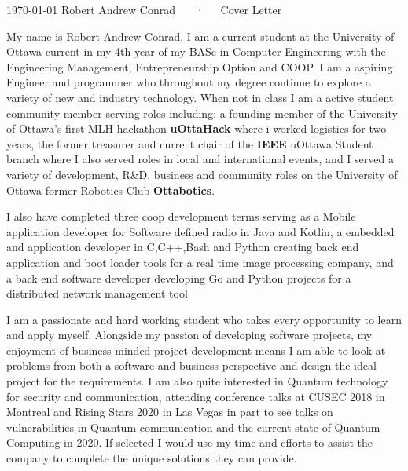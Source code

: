 \documentclass[11pt, a4paper]{awesome-cv}
\begin{document}
\makecvheader[R]

\makecvfooter
  {\today}
  {Robert Andrew Conrad ~~~·~~~Cover Letter}
  {}

\makelettertitle

\begin{cvletter}


My name is Robert Andrew Conrad, I am a current student at the University of Ottawa current in my 4th year of my BASc in Computer Engineering with the Engineering Management, Entrepreneurship Option and COOP. I am a aspiring Engineer and programmer who throughout my degree continue to explore a variety of new and industry technology. When not in class I am a active student community member serving roles including: a founding member of the University of Ottawa's first MLH hackathon \textbf{uOttaHack} where i worked logistics for two years, the former treasurer and current chair of the \textbf{IEEE} uOttawa Student branch where I also served roles in local and international events, and I served a variety of development, R&D, business and community roles on the University of Ottawa former Robotics Club \textbf{Ottabotics}.

I also have completed three coop development terms serving as a Mobile application developer for Software defined radio in Java and Kotlin, a embedded and application developer in C,C++,Bash and Python creating back end application and boot loader tools for a real time image processing company, and a back end software developer developing Go and Python projects for a distributed network management tool 



I am a passionate and hard working student who takes every opportunity to learn and apply myself. Alongside my passion of developing software projects, my enjoyment of business minded project development means I am able to look at problems from both a software and business perspective and design the ideal project for the requirements. I am also quite interested in Quantum technology for security and communication, attending conference talks at CUSEC 2018 in Montreal and Rising Stars 2020 in Las Vegas in part to see talks on vulnerabilities in Quantum communication and the current state of Quantum Computing in 2020. If selected I would use my time and efforts to assist the company to complete the unique solutions they can provide. 

\end{cvletter}


\makeletterclosing
\end{document}
